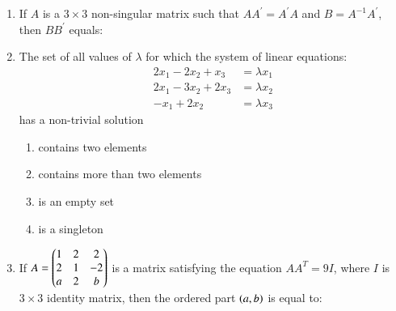 \documentclass[journal,12pt,twocolumn]{IEEEtran}
\theoremstyle{remark}
\begin{document}
\begin{enumerate}
	\item If $A$ is a $3\times3$ non-singular matrix such that $AA^{\prime}=A^{\prime}A$ and $B=A^{-1}A^{\prime}$, then $BB^{\prime}$ equals:
	\hfill {}{\par}
	\begin{enumerate}
        \end{enumerate}


    \item The set of all values of $\lambda$ for which the system of linear equations:
	\begin{align*}
		2x_1-2x_2+x_3 &= \lambda x_1\\
		2x_1-3x_2+2x_3 &= \lambda x_2\\
		-x_1+2x_2 &= \lambda x_3
	\end{align*}
	has a non-trivial solution

	\hfill{\brak{JEE M 2015}}
	\begin{enumerate}
		\item contains two elements
		\item contains more than two elements
		\item is an empty set
		\item is a singleton
	\end{enumerate}


	\item If $A = \begin{pmatrix}1&2&2\\2&1&-2\\a&2&b\end{pmatrix}$ is a matrix satisfying the equation $AA^T = 9I$, where $I$ is $3\times3$ identity matrix, then the ordered part $\left(a,b\right)$ is equal to:
	\hfill {}{\par}
	\begin{enumerate}


\end{enumerate}
\end{enumerate}
\end{document}
